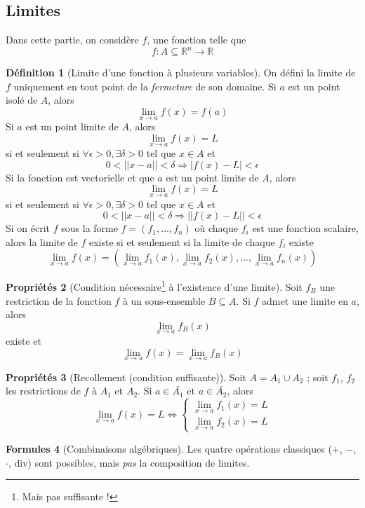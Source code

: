 \documentclass[11pt,a4paper]{article}
\theoremstyle{definition}
\newtheorem{mydef}{Définition}[section]
\newtheorem{myprop}[mydef]{Propriétés}
\newtheorem{myform}[mydef]{Formules}
\newcommand{\R}{\mathbb{R}}
\renewcommand{\div}{\mathrm{div}}
\newcommand{\fl}{\rightarrow}
\begin{document}
\subsection{Limites}

Dans cette partie, on considère $f$, une fonction telle que
\[ f : A \subseteq \R^n \rightarrow \R \]

\begin{mydef}[Limite d'une fonction à plusieurs variables]
On défini la limite de $f$ uniquement en tout point de la \emph{fermeture} de son domaine.
Si $a$ est un point isolé de $A$, alors
\[ \lim_{x \fl a} f(x) = f(a) \]
Si $a$ est un point limite de $A$, alors
\[ \lim_{x \fl a} f(x) = L \]
si et seulement si $\forall \epsilon >0, \exists \delta > 0$ tel que $x \in A$ et
\[ 0 < || x - a || < \delta \Rightarrow |f(x) - L| < \epsilon \]
Si la fonction est vectorielle et que $a$ est un point limite de $A$, alors
\[ \lim_{x \fl a} f(x) = L \]
si et seulement si $\forall \epsilon >0, \exists \delta > 0$ tel que $x \in A$ et
\[ 0 < || x - a || < \delta \Rightarrow ||f(x) - L|| < \epsilon \]
Si on écrit $f$ sous la forme $f = (f_1 , \dots , f_n)$ où chaque $f_i$ est une fonction scalaire, alors la limite de $f$ existe si et seulement si la limite de chaque $f_i$ existe
\[ \lim_{x \fl a} f(x) = \left( \lim_{x \fl a} f_1(x), \lim_{x \fl a} f_2(x), \dots , \lim_{x \fl a} f_n(x) \right) \]
\end{mydef}

\begin{myprop}[Condition nécessaire\footnote{Mais pas suffisante !} à l'existence d'une limite] Soit $f_B$ une restriction de la fonction $f$ à un sous-ensemble $B \subseteq A$. Si $f$ admet une limite en $a$, alors
\[ \lim_{x \fl a}f_B(x) \]
existe et
\[ \lim_{x \fl a}f(x) = \lim_{x \fl a}f_B(x) \]
\end{myprop}

\begin{myprop}[Recollement (condition suffisante)] Soit $A = A_1 \cup A_2$ ; soit $f_1$, $f_2$ les restrictions de $f$ à $A_1$ et $A_2$. Si $a \in \bar{A_1}$ et $a \in \bar{A_2}$, alors
\[ \lim_{x \fl a}f(x) = L \Leftrightarrow \left\{ \begin{array}{l} \lim_{x \fl a} f_1(x) = L \\ \lim_{x \fl a}f_2(x) = L \end{array} \right. \]
\end{myprop}

\begin{myform}[Combinaisons algébriques] Les quatre opérations classiques ($+$, $-$, $\cdot$, $\div$) sont possibles, mais \emph{pas} la composition de limites. \end{myform}
\end{document}

